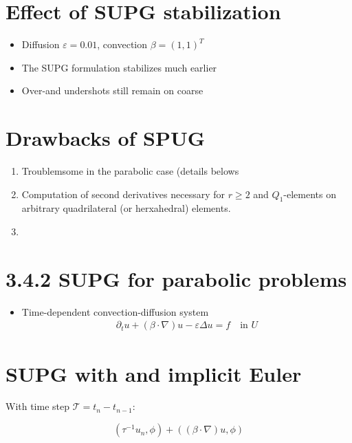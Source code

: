 \documentclass[openany,a4paper,11pt]{memoir}
\theoremstyle{definition}
\begin{document}
\section{Effect of SUPG stabilization}


\begin{itemize}
\item Diffusion $\varepsilon = 0.01$, convection $\beta=(1,1)^T$
  
\item The SUPG formulation stabilizes much earlier
  
\item Over-and undershots still remain on coarse
\end{itemize}

\section{Drawbacks of SPUG}

\begin{enumerate}
\item Troublemsome in the parabolic case (details belows
  
\item Computation of second derivatives necessary for $r\ge2$ and $Q_1$-elements on arbitrary quadrilateral (or herxahedral) elements.

  
\item 
\end{enumerate}

\section{3.4.2 SUPG for parabolic problems}

\begin{itemize}
\item Time-dependent convection-diffusion system
  \begin{align*}
    \partial_tu+(\beta\cdot\nabla)u-\varepsilon\Delta u= f\quad\text{in }U
  \end{align*}
\end{itemize}

\section{SUPG with and implicit Euler}

With time step $\mathcal{T}=t_n-t_{n-1}$:

\[(\tau^{-1}u_n,\phi)+((\beta\cdot\nabla)u,\phi)  \]
\end{document}
